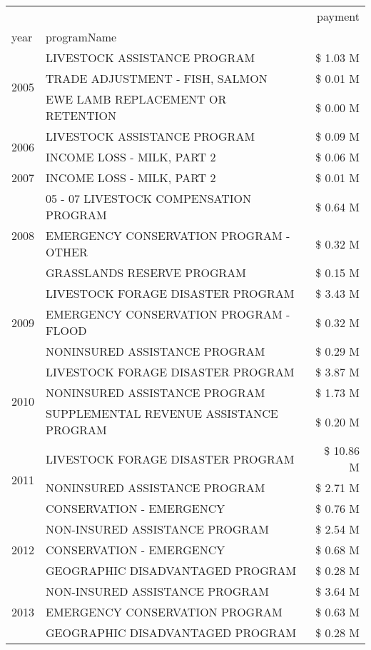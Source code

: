 \begin{tabular}{llr}
\toprule
 &  & payment \\
year & programName &  \\
\midrule
\multirow[t]{3}{*}{2005} & LIVESTOCK ASSISTANCE PROGRAM & \$ 1.03 M \\
 & TRADE ADJUSTMENT - FISH, SALMON & \$ 0.01 M \\
 & EWE LAMB REPLACEMENT OR RETENTION & \$ 0.00 M \\
\cline{1-3}
\multirow[t]{2}{*}{2006} & LIVESTOCK ASSISTANCE PROGRAM & \$ 0.09 M \\
 & INCOME LOSS - MILK, PART 2 & \$ 0.06 M \\
\cline{1-3}
2007 & INCOME LOSS - MILK, PART 2 & \$ 0.01 M \\
\cline{1-3}
\multirow[t]{3}{*}{2008} & 05 - 07 LIVESTOCK COMPENSATION PROGRAM & \$ 0.64 M \\
 & EMERGENCY CONSERVATION PROGRAM - OTHER & \$ 0.32 M \\
 & GRASSLANDS RESERVE PROGRAM & \$ 0.15 M \\
\cline{1-3}
\multirow[t]{3}{*}{2009} & LIVESTOCK FORAGE DISASTER  PROGRAM & \$ 3.43 M \\
 & EMERGENCY CONSERVATION PROGRAM - FLOOD & \$ 0.32 M \\
 & NONINSURED ASSISTANCE PROGRAM & \$ 0.29 M \\
\cline{1-3}
\multirow[t]{3}{*}{2010} & LIVESTOCK FORAGE DISASTER PROGRAM & \$ 3.87 M \\
 & NONINSURED ASSISTANCE PROGRAM & \$ 1.73 M \\
 & SUPPLEMENTAL REVENUE ASSISTANCE PROGRAM & \$ 0.20 M \\
\cline{1-3}
\multirow[t]{3}{*}{2011} & LIVESTOCK FORAGE DISASTER PROGRAM & \$ 10.86 M \\
 & NONINSURED ASSISTANCE PROGRAM & \$ 2.71 M \\
 & CONSERVATION - EMERGENCY & \$ 0.76 M \\
\cline{1-3}
\multirow[t]{3}{*}{2012} & NON-INSURED ASSISTANCE PROGRAM & \$ 2.54 M \\
 & CONSERVATION - EMERGENCY & \$ 0.68 M \\
 & GEOGRAPHIC DISADVANTAGED PROGRAM & \$ 0.28 M \\
\cline{1-3}
\multirow[t]{3}{*}{2013} & NON-INSURED ASSISTANCE PROGRAM & \$ 3.64 M \\
 & EMERGENCY CONSERVATION PROGRAM & \$ 0.63 M \\
 & GEOGRAPHIC DISADVANTAGED PROGRAM & \$ 0.28 M \\

\end{tabular}
